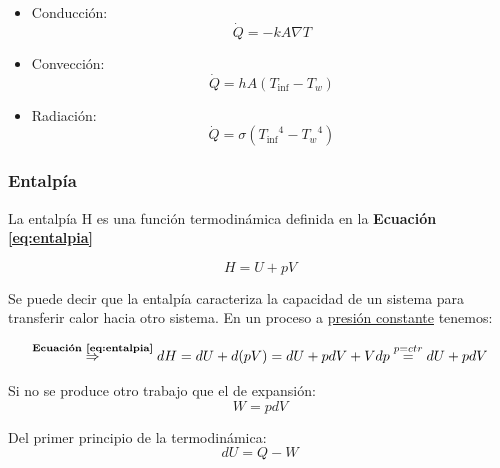         \begin{itemize}
            \item Conducción:
                \begin{equation}
                \label{eq:calor_conduccion}
                    \dot{Q} = -kA \nabla T
                \end{equation}
            \item Convección:
                \begin{equation}
                \label{eq:calor_conveccion}
                    \dot{Q} = hA \left ( T_{\inf} - T_{w} \right )
                \end{equation}
            \item Radiación:
                \begin{equation}
                \label{eq:calor_radiacion}
                    \dot{Q} = \sigma \left ( {T_{\inf}}^{4} - {T_{w}}^{4} \right )
                \end{equation}
        \end{itemize}
        
        \subsubsection{Entalpía}
        
        La entalpía H es una función termodinámica definida en la \textbf{Ecuación \ref{eq:entalpia}}
        
        \begin{equation}
        \label{eq:entalpia}
            H = U + pV
        \end{equation}
        
        Se puede decir que la entalpía caracteriza la capacidad de un sistema para transferir calor hacia otro sistema. En un proceso a \underline{presión constante} tenemos:
        
        \[\overset{\text{\textbf{Ecuación \ref{eq:entalpia}}}}{\Rightarrow} dH = dU + d(pV) = dU + pdV + Vdp \overset{p = ctr}{=} dU + pdV\]
        
        Si no se produce otro trabajo que el de expansión:
        \begin{equation}
        \label{eq:trabajo_expansion}
            W = pdV
        \end{equation}
        
        Del primer principio de la termodinámica:
        \begin{equation}
        \label{eq:primer_principio}
            dU = Q - W
        \end{equation}
        
